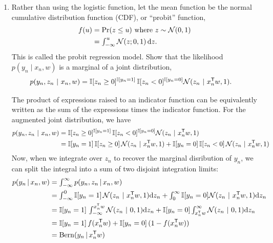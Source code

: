 \begin{enumerate}[label=(\alph*)]
\item Rather than using the logistic function, let the mean function be the normal cumulative distribution function (CDF), or ``probit'' function,
\begin{align*}
    f(u) &= \Pr(z \leq u) \text{ where } z \sim \mathcal{N}(0, 1) \\
    &= \textstyle\int_{-\infty}^u \mathcal{N}(z; 0, 1) \, \mathrm{d}z.
\end{align*}
This is called the probit regression model.  Show that the likelihood~$p(y_n \mid x_n, w)$ is a marginal of a joint distribution,
\begin{align*}
    p(y_n, z_n ~\vert~ x_n, w) &= \mathbb{I}[z_n \geq 0]^{\mathbb{I}[y_n = 1]} \, \mathbb{I}[z_n < 0]^{\mathbb{I}[y_n = 0]} \mathcal{N}(z_n ~\vert~ x_n^{\mathsf{T}} w, 1).
\end{align*}


\begin{solution}
The product of expressions raised to an indicator function can be equivalently written as the sum of the expressions times the indicator function. For the augmented joint distribution, we have
\begin{align*}
    p(y_n, z_n ~\vert~ x_n, w)
        &=  \mathbb{I}[z_n \geq 0]^{\mathbb{I}[y_n = 1]} \,
            \mathbb{I}[z_n < 0]^{\mathbb{I}[y_n = 0]}
            \mathcal{N}(z_n ~\vert~ x_n^{\mathsf{T}} w, 1)\\
        &=  \mathbb{I}[y_n = 1]\,\mathbb{I}[z_n \geq 0] \,
            \mathcal{N}(z_n ~\vert~ x_n^{\mathsf{T}} w, 1)
            + \mathbb{I}[y_n = 0]\,\mathbb{I}[z_n < 0] \,
            \mathcal{N}(z_n ~\vert~ x_n^{\mathsf{T}} w, 1)
\end{align*}
Now, when we integrate over $z_n$ to recover the marginal disribution of $y_n$, we can split the integral into a sum of two disjoint integration limits:
\begin{align*}
    p(y_n \,|\, x_n, w)
        &= \textstyle\int_{-\infty}^\infty p(y_n, z_n \,|\, x_n, w) \\
        &= \textstyle\int_{-\infty}^0
                \mathbb{I}[y_n = 1]\,
                \mathcal{N}(z_n ~\vert~ x_n^{\mathsf{T}} w, 1) \mathrm{d}z_n
            + \textstyle\int_{0}^\infty
                \mathbb{I}[y_n = 0]
                \mathcal{N}(z_n ~\vert~ x_n^{\mathsf{T}} w, 1) \mathrm{d}z_n\\
        &= \mathbb{I}[y_n = 1]\,
                \textstyle\int_{-\infty}^{x_n^{\mathsf{T}} w}
                \mathcal{N}(z_n ~\vert~ 0, 1) \mathrm{d}z_n
            + \mathbb{I}[y_n = 0]
                \textstyle\int_{x_n^{\mathsf{T}} w}^\infty
                \mathcal{N}(z_n ~\vert~ 0, 1) \mathrm{d}z_n\\
        &= \mathbb{I}[y_n = 1]\, f(x_n^{\mathsf{T}} w)
            + \mathbb{I}[y_n = 0]\,(1-f(x_n^{\mathsf{T}} w)) \\
        &= \mathrm{Bern}(y_n \,|\, x_n^{\mathsf{T}} w)
\end{align*}


\end{solution}
\end{enumerate}
